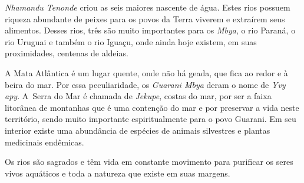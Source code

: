  

 


 

\emph{Nhamandu Tenonde} criou as seis maiores nascente de água. Estes
rios possuem riqueza abundante de peixes para os povos da Terra viverem
e extraírem seus alimentos. Desses rios, três são muito importantes para
os \emph{Mbya}, o rio Paraná, o rio Uruguai e também o rio Iguaçu, onde
ainda hoje existem, em suas proximidades, centenas de aldeias.

A Mata Atlântica é um lugar quente, onde não há geada, que fica ao redor
e à beira do mar. Por essa peculiaridade, os \emph{Guarani Mbya} deram o
nome de \emph{Yvy apy}. A~Serra do Mar é chamada de \emph{Jekupe},
costas do mar, por ser a faixa litorânea de montanhas que é uma
contenção do mar e por preservar a vida neste território, sendo muito
importante espiritualmente para o povo Guarani. Em seu interior existe
uma abundância de espécies de animais silvestres e plantas medicinais
endêmicas.


 

Os rios são sagrados e têm vida em constante movimento para purificar os
seres vivos aquáticos e toda a natureza que existe em suas margens.

 
